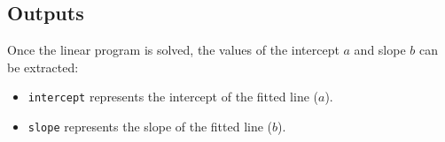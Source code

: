 \documentclass{article}
\begin{document}
\subsection*{Outputs}
Once the linear program is solved, the values of the intercept $a$ and slope $b$ can be extracted:

\begin{itemize}
    \item \texttt{intercept} represents the intercept of the fitted line ($a$).
    \item \texttt{slope} represents the slope of the fitted line ($b$).
\end{itemize}
\end{document}
